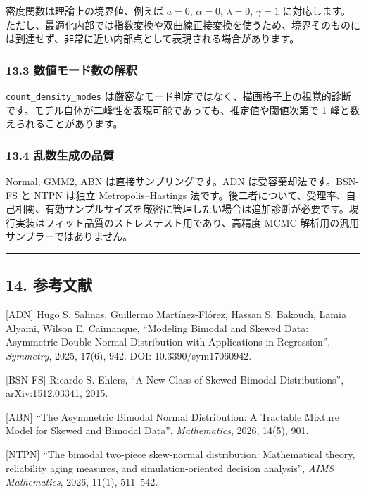 \documentclass[
]{article}
\begin{document}
密度関数は理論上の境界値、例えば \(a=0\), \(\alpha=0\), \(\lambda=0\),
\(\gamma=1\)
に対応します。ただし、最適化内部では指数変換や双曲線正接変換を使うため、境界そのものには到達せず、非常に近い内部点として表現される場合があります。

\hypertarget{ux6570ux5024ux30e2ux30fcux30c9ux6570ux306eux89e3ux91c8}{%
\subsubsection{13.3
数値モード数の解釈}\label{ux6570ux5024ux30e2ux30fcux30c9ux6570ux306eux89e3ux91c8}}

\texttt{count\_density\_modes}
は厳密なモード判定ではなく、描画格子上の視覚的診断です。モデル自体が二峰性を表現可能であっても、推定値や閾値次第で
1 峰と数えられることがあります。

\hypertarget{ux4e71ux6570ux751fux6210ux306eux54c1ux8cea}{%
\subsubsection{13.4
乱数生成の品質}\label{ux4e71ux6570ux751fux6210ux306eux54c1ux8cea}}

Normal, GMM2, ABN は直接サンプリングです。ADN は受容棄却法です。BSN-FS
と NTPN は独立 Metropolis--Hastings
法です。後二者について、受理率、自己相関、有効サンプルサイズを厳密に管理したい場合は追加診断が必要です。現行実装はフィット品質のストレステスト用であり、高精度
MCMC 解析用の汎用サンプラーではありません。

\begin{center}\rule{0.5\linewidth}{0.5pt}\end{center}

\hypertarget{ux53c2ux8003ux6587ux732e}{%
\subsection{14. 参考文献}\label{ux53c2ux8003ux6587ux732e}}

{[}ADN{]} Hugo S. Salinas, Guillermo Martínez-Flórez, Hassan S. Bakouch,
Lamia Alyami, Wilson E. Caimanque, ``Modeling Bimodal and Skewed Data:
Asymmetric Double Normal Distribution with Applications in Regression'',
\emph{Symmetry}, 2025, 17(6), 942. DOI: 10.3390/sym17060942.

{[}BSN-FS{]} Ricardo S. Ehlers, ``A New Class of Skewed Bimodal
Distributions'', arXiv:1512.03341, 2015.

{[}ABN{]} ``The Asymmetric Bimodal Normal Distribution: A Tractable
Mixture Model for Skewed and Bimodal Data'', \emph{Mathematics}, 2026,
14(5), 901.

{[}NTPN{]} ``The bimodal two-piece skew-normal distribution:
Mathematical theory, reliability aging measures, and simulation-oriented
decision analysis'', \emph{AIMS Mathematics}, 2026, 11(1), 511--542.
\end{document}
